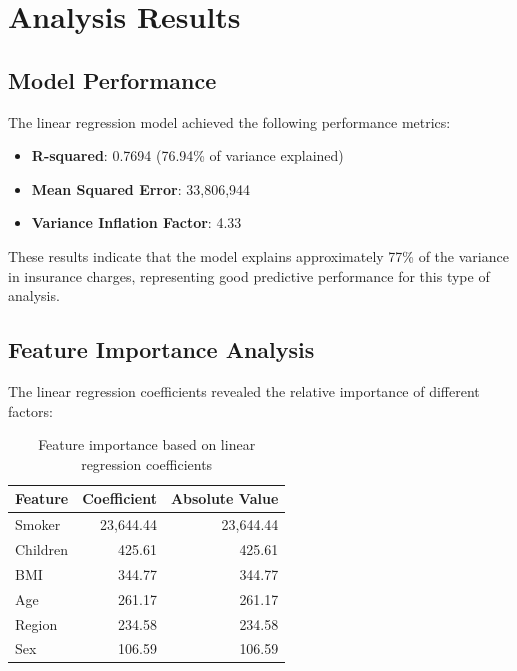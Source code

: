 \documentclass[12pt,a4paper]{article}
\begin{document}
\section{Analysis Results}

\subsection{Model Performance}

The linear regression model achieved the following performance metrics:
\begin{itemize}
    \item \textbf{R-squared}: 0.7694 (76.94\% of variance explained)
    \item \textbf{Mean Squared Error}: 33,806,944
    \item \textbf{Variance Inflation Factor}: 4.33
\end{itemize}

These results indicate that the model explains approximately 77\% of the variance in insurance charges, representing good predictive performance for this type of analysis.

\subsection{Feature Importance Analysis}

The linear regression coefficients revealed the relative importance of different factors:

\begin{table}[H]
\centering
\begin{tabular}{lrr}
\toprule
\textbf{Feature} & \textbf{Coefficient} & \textbf{Absolute Value} \\
\midrule
Smoker & 23,644.44 & 23,644.44 \\
Children & 425.61 & 425.61 \\
BMI & 344.77 & 344.77 \\
Age & 261.17 & 261.17 \\
Region & 234.58 & 234.58 \\
Sex & 106.59 & 106.59 \\
\bottomrule
\end{tabular}
\caption{Feature importance based on linear regression coefficients}
\end{table}
\end{document}
